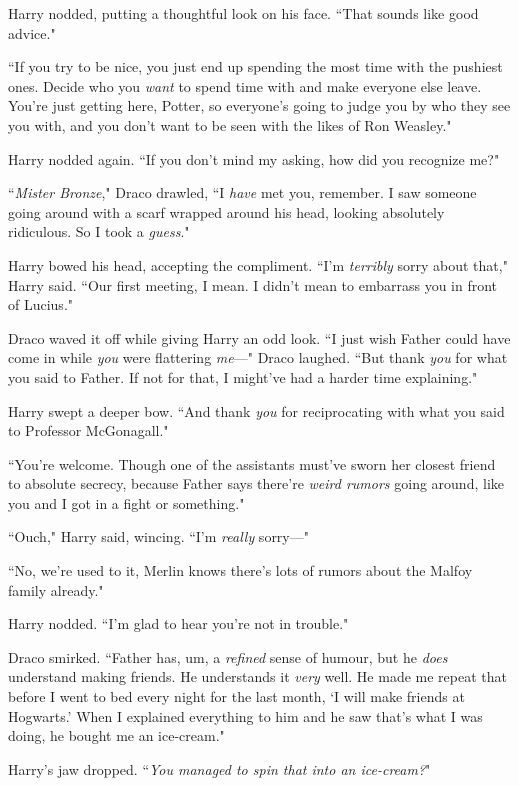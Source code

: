 Harry nodded, putting a thoughtful look on his face. ``That sounds like good advice."

``If you try to be nice, you just end up spending the most time with the pushiest ones. Decide who you \emph{want} to spend time with and make everyone else leave. You're just getting here, Potter, so everyone's going to judge you by who they see you with, and you don't want to be seen with the likes of Ron Weasley."

Harry nodded again. ``If you don't mind my asking, how did you recognize me?"

``\emph{Mister Bronze}," Draco drawled, ``I \emph{have} met you, remember. I saw someone going around with a scarf wrapped around his head, looking absolutely ridiculous. So I took a \emph{guess}."

Harry bowed his head, accepting the compliment. ``I'm \emph{terribly} sorry about that," Harry said. ``Our first meeting, I mean. I didn't mean to embarrass you in front of Lucius."

Draco waved it off while giving Harry an odd look. ``I just wish Father could have come in while \emph{you} were flattering \emph{me}—" Draco laughed. ``But thank \emph{you} for what you said to Father. If not for that, I might've had a harder time explaining."

Harry swept a deeper bow. ``And thank \emph{you} for reciprocating with what you said to Professor McGonagall."

``You're welcome. Though one of the assistants must've sworn her closest friend to absolute secrecy, because Father says there're \emph{weird rumors} going around, like you and I got in a fight or something."

``Ouch," Harry said, wincing. ``I'm \emph{really} sorry—"

``No, we're used to it, Merlin knows there's lots of rumors about the Malfoy family already."

Harry nodded. ``I'm glad to hear you're not in trouble."

Draco smirked. ``Father has, um, a \emph{refined} sense of humour, but he \emph{does} understand making friends. He understands it \emph{very} well. He made me repeat that before I went to bed every night for the last month, `I will make friends at Hogwarts.' When I explained everything to him and he saw that's what I was doing, he bought me an ice-cream."

Harry's jaw dropped. ``\emph{You managed to spin that into an ice-cream?}"

